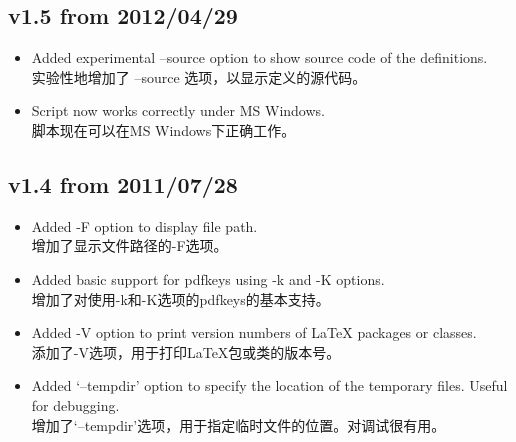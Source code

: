 \documentclass{article}
\begin{document}
\subsection*{v1.5 from 2012/04/29}
\begin{itemize}
 \item Added experimental --source option to show source code of the definitions.
\\实验性地增加了 --source 选项，以显示定义的源代码。
 \item Script now works correctly under MS Windows.
\\脚本现在可以在MS Windows下正确工作。
\end{itemize}

\subsection*{v1.4 from 2011/07/28}
\begin{itemize}
 \item Added -F option to display file path.
\\增加了显示文件路径的-F选项。
\item Added basic support for pdfkeys using -k and -K options.
\\增加了对使用-k和-K选项的pdfkeys的基本支持。
\item Added -V option to print version numbers of LaTeX packages or classes.
\\添加了-V选项，用于打印LaTeX包或类的版本号。
\item Added `--tempdir' option to specify the location of the temporary files. Useful for debugging.
\\增加了`--tempdir'选项，用于指定临时文件的位置。对调试很有用。
\end{itemize}
\end{document}
